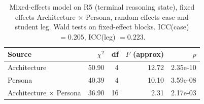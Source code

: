 \begin{table}[htbp]
\centering
\caption{Mixed-effects model on R5 (terminal reasoning state), fixed effects Architecture $\times$ Persona, random effects case and student leg. Wald tests on fixed-effect blocks. ICC(case) $= 0.205$, ICC(leg) $= 0.223$.}
\label{tab:anova-R5}
\begin{tabular}{lrrrr}
\toprule
Source & $\chi^2$ & df & $F$ (approx) & $p$ \\
\midrule
Architecture & 50.90 & 4 & 12.72 & 2.35e-10 \\
Persona & 40.39 & 4 & 10.10 & 3.59e-08 \\
Architecture $\times$ Persona & 36.90 & 16 & 2.31 & 2.17e-03 \\
\bottomrule
\end{tabular}
\end{table}
